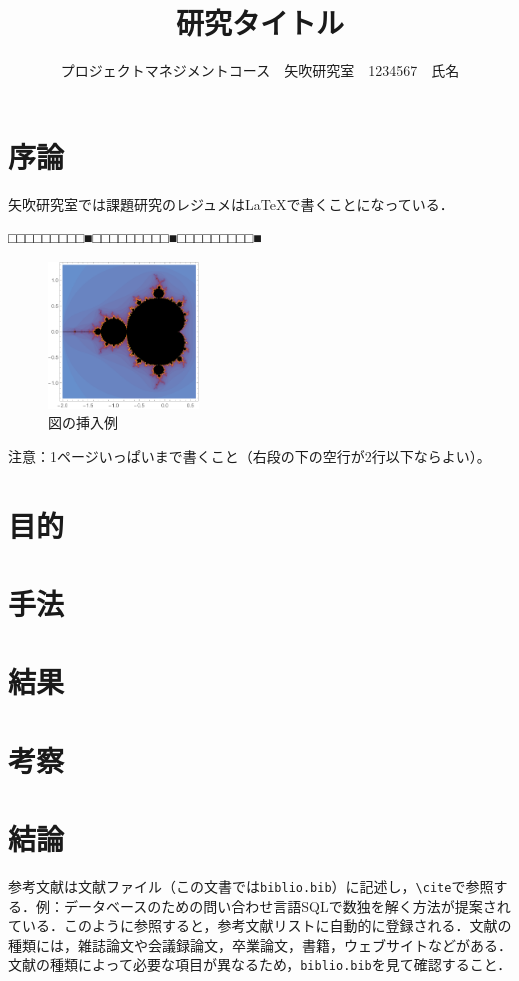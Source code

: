 \documentclass[uplatex,twocolumn,dvipdfmx]{jsarticle}
\title{\vspace{-5mm}\fontsize{14pt}{0pt}\selectfont 研究タイトル}
\author{\normalsize プロジェクトマネジメントコース　矢吹研究室　1234567　氏名}
\date{}
\begin{document}
\fontsize{10.5pt}{\baselineskip}\selectfont
\maketitle





\section{序論}

矢吹研究室では課題研究のレジュメは\LaTeX で書くことになっている．

\noindent
□□□□□□□□□■□□□□□□□□□■□□□□□□□□□■

\begin{figure}[h]
\centering
\includegraphics[width=4cm,clip]{figure.pdf}
\caption{図の挿入例}\label{サンプル図}
\end{figure}

\noindent
注意：1ページいっぱいまで書くこと（右段の下の空行が2行以下ならよい）。

\section{目的}

\section{手法}

\section{結果}

\section{考察}

\section{結論}

参考文献は文献ファイル（この文書では\verb|biblio.bib|）に記述し，\verb|\cite|で参照する．例：データベースのための問い合わせ言語SQLで数独を解く方法が提案されている\cite{yabuki2011}．このように参照すると，参考文献リストに自動的に登録される．文献の種類には，雑誌論文\cite{yabuki2011}や会議録論文\cite{yabuki2013}，卒業論文\cite{kubo2014}，書籍\cite{okumura2013}，ウェブサイト\cite{self}などがある．文献の種類によって必要な項目が異なるため，\verb|biblio.bib|を見て確認すること．


\end{document}
